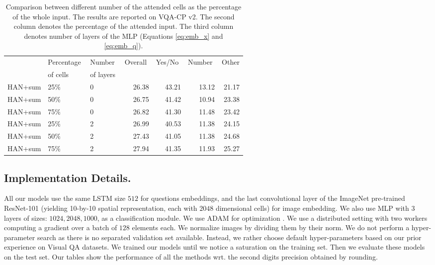 \begin{table*}[tb]
\begin{center}
\begin{tabular}{lllrrrr}
\toprule
 & Percentage\,\, & Number\,\, & Overall\,\, & Yes/No\,\, & Number\,\, & Other \\
 & of cells\,\, & of layers\,\,  & & & & \\
 \cmidrule(ll){1-3}\cmidrule(lr){4-7}
 HAN+sum & 25\% & 0 & 26.38 & 43.21 & 13.12 & 21.17 \\
 HAN+sum & 50\% & 0 & 26.75 & 41.42 & 10.94 & 23.38 \\
 HAN+sum & 75\%   & 0 & 26.82 & 41.30 & 11.48 & 23.42 \\
\midrule
 HAN+sum & 25\% & 2 & 26.99 & 40.53 & 11.38 & 24.15 \\
 HAN+sum & 50\% & 2 & 27.43 & 41.05 & 11.38 & 24.68 \\
 HAN+sum & 75\% & 2 & 27.94 & 41.35 & 11.93 & 25.27 \\
\bottomrule
\end{tabular}
\end{center}
\caption{
Comparison between different number of the attended 
cells as the percentage of the whole input. The results are reported on VQA-CP v2. The second column denotes the 
percentage of the attended input.
The third column denotes number of layers of the MLP (Equations \ref{eq:emb_x} and \ref{eq:emb_q}).
}
\label{table:han-sum-attention_numbers}
\end{table*}

\subsection{Implementation Details.}
All our models use the same LSTM size $512$ for questions embeddings, and the last convolutional layer of the ImageNet pre-trained ResNet-101 \cite{he2015deep} (yielding 10-by-10 spatial representation, each with $2048$ dimensional cells) for image embedding. We also use MLP with $3$ layers of sizes: $1024, 2048, 1000$, as a classification module. We use ADAM for optimization \cite{kingma2014adam}. We use a distributed setting with two workers computing a gradient over a batch of $128$ elements each. We normalize images by dividing them by their norm. We do not perform a hyper-parameter search as there is no separated validation set available. Instead, we rather choose default hyper-parameters based on our prior experience on Visual QA datasets. We trained our models until we notice a saturation on the training set. Then we evaluate these models on the test set. Our tables show the performance of all the methods wrt. the second digits precision obtained by rounding.

